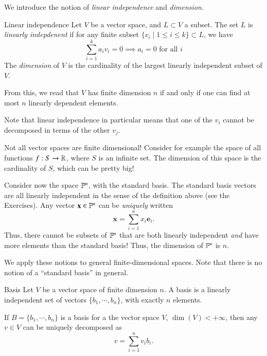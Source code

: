 We introduce the notion of \emph{linear independence} and \emph{dimension}.
\begin{myDefinition}{Linear independence}{}
    Let $V$ be a vector space, and $L \subset V$ a subset. The set $L$ is \emph{linearly indepdenent} if for any finite subset $\{v_i \mid 1 \leq i \leq k \} \subset L$, we have
    \[ \sum_{i=1}^k a_i v_i = 0 \implies  a_i = 0 \text{ for all $i$} \]
    The \emph{dimension} of $V$ is the cardinality of the largest linearly independent subset of $V$.
\end{myDefinition}


From this, we read that $V$ has finite dimension $n$ if and only if one can find at most $n$ linearly dependent elements.

Note that linear independence in particular means that one of the $v_i$ cannot be decomposed in terms of the other $v_j$.

Not all vector spaces are finite dimensional! Consider for example the space of all functions $f : S \to \mathbb{R}$, where $S$ is an infinite set. The dimension of this space is the cardinality of $S$, which can be pretty big!


Consider now the space $\mathbb{F}^n$, with the standard basis. The standard basis vectors are all linearly independent in the sense of the definition above (see the Exercises). Any vector $\mathbf{x} \in \mathbb{F}^n$ can be \emph{uniquely} written
\begin{equation}
    \mathbf{x} = \sum_{i=1}^n x_i \mathbf{e}_i.
\end{equation}
Thus, there cannot be subsets of $\mathbb{F}^n$ that are both linearly independent \emph{and} have more elements than the standard basis! Thus, the dimension of $\mathbb{F}^n$ is $n$.

We apply these notions to general finite-dimensional spaces. Note that there is no notion of a ``standard basis'' in general.



\begin{myDefinition}{Basis}{}
    Let $V$ be a vector space of finite dimension $n$. A basis is a linearly independent set of vectors $\{b_1,\cdots,b_n\}$, with exactly $n$ elements.
\end{myDefinition}
 
\begin{myTheorem}{}{}
    If $B= \{b_1,\cdots,b_n\}$ is a basis for a the vector space $V$, $\dim(V)<+\infty$, then any $v \in V$ can be uniquely decomposed as
    \begin{equation}
        v = \sum_{i=1}^n v_i b_i.
    \end{equation}
\end{myTheorem}

